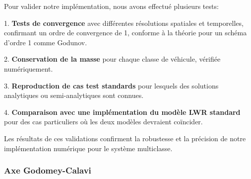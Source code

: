 Pour valider notre implémentation, nous avons effectué plusieurs tests:

1. \textbf{Tests de convergence} avec différentes résolutions spatiales et temporelles, confirmant un ordre de convergence de 1, conforme à la théorie pour un schéma d'ordre 1 comme Godunov.

2. \textbf{Conservation de la masse} pour chaque classe de véhicule, vérifiée numériquement.

3. \textbf{Reproduction de cas test standards} pour lesquels des solutions analytiques ou semi-analytiques sont connues.

4. \textbf{Comparaison avec une implémentation du modèle LWR standard} pour des cas particuliers où les deux modèles devraient coïncider.

Les résultats de ces validations confirment la robustesse et la précision de notre implémentation numérique pour le système multiclasse.





\subsubsection{Axe Godomey-Calavi}
\label{subsubsec:axe_godomey}

